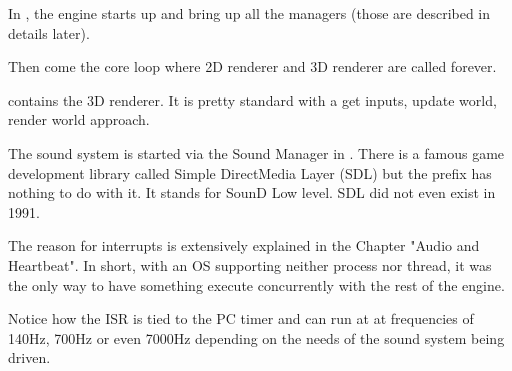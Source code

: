 \documentclass[book.tex]{subfiles}
\begin{document}
\par
In , the engine starts up and bring up all the managers (those are described in details later).\\
\par
\begin{minipage}{\textwidth}

\end{minipage}
\par
Then come the core loop where 2D renderer and 3D renderer are called forever.\\
\par
\begin{minipage}{\textwidth}

\end{minipage}
\par
{} contains the 3D renderer. It is pretty standard with a get inputs, update world, render world approach.\\
\par
\begin{minipage}{\textwidth}

\end{minipage}
\par
The sound system is started via the Sound Manager in . There is a famous game development library called Simple DirectMedia Layer (SDL) but the prefix  has nothing to do with it. It stands for SounD Low level. SDL did not even exist in 1991.\\
\par
The reason for interrupts is extensively explained in the Chapter "Audio and Heartbeat". In short, with an OS supporting neither process nor thread, it was the only way to have something execute concurrently with the rest of the engine.\\
\par
Notice how the ISR is tied to the PC timer and can run at at frequencies of 140Hz, 700Hz or even 7000Hz depending on the needs of the sound system being driven.\\
\par
\begin{minipage}{\textwidth}

\end{minipage}
\par
\end{document}
